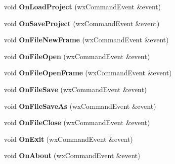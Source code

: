 \begin{DoxyCompactItemize}
\item 
\hypertarget{class_my_frame_ad74164812c96ccffaab0a838ad3ec5c4}{void {\bfseries On\+Load\+Project} (wx\+Command\+Event \&event)}\label{class_my_frame_ad74164812c96ccffaab0a838ad3ec5c4}

\item 
\hypertarget{class_my_frame_aa86080f2ffa1c07a135d694ba769d5fe}{void {\bfseries On\+Save\+Project} (wx\+Command\+Event \&event)}\label{class_my_frame_aa86080f2ffa1c07a135d694ba769d5fe}

\item 
\hypertarget{class_my_frame_a6b3f9709ddfc01c14d06f7f630d5f7d8}{void {\bfseries On\+File\+New\+Frame} (wx\+Command\+Event \&event)}\label{class_my_frame_a6b3f9709ddfc01c14d06f7f630d5f7d8}

\item 
\hypertarget{class_my_frame_a9b559c7ef01b41e31e88e05bf410a39b}{void {\bfseries On\+File\+Open} (wx\+Command\+Event \&event)}\label{class_my_frame_a9b559c7ef01b41e31e88e05bf410a39b}

\item 
\hypertarget{class_my_frame_a2cda7ffa7a914f8a6e9722cfc61ec68b}{void {\bfseries On\+File\+Open\+Frame} (wx\+Command\+Event \&event)}\label{class_my_frame_a2cda7ffa7a914f8a6e9722cfc61ec68b}

\item 
\hypertarget{class_my_frame_a755476d85a15af2da071de070812d953}{void {\bfseries On\+File\+Save} (wx\+Command\+Event \&event)}\label{class_my_frame_a755476d85a15af2da071de070812d953}

\item 
\hypertarget{class_my_frame_a4e693828efb571fb2992d0afbf851963}{void {\bfseries On\+File\+Save\+As} (wx\+Command\+Event \&event)}\label{class_my_frame_a4e693828efb571fb2992d0afbf851963}

\item 
\hypertarget{class_my_frame_aacab35fe30d1d45944307c71a4179ea1}{void {\bfseries On\+File\+Close} (wx\+Command\+Event \&event)}\label{class_my_frame_aacab35fe30d1d45944307c71a4179ea1}

\item 
\hypertarget{class_my_frame_ab72daefc5a74695f02427ae126df7261}{void {\bfseries On\+Exit} (wx\+Command\+Event \&event)}\label{class_my_frame_ab72daefc5a74695f02427ae126df7261}

\item 
\hypertarget{class_my_frame_ab470cba0c5d8d46980c602589d556ee5}{void {\bfseries On\+About} (wx\+Command\+Event \&event)}\label{class_my_frame_ab470cba0c5d8d46980c602589d556ee5}


\end{DoxyCompactItemize}
